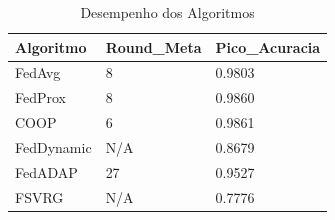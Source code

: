\begin{table}
\caption{Desempenho dos Algoritmos}
\label{tab:performance}
\begin{tabular}{lll}
\toprule
Algoritmo & Round_Meta & Pico_Acuracia \\
\midrule
FedAvg & 8 & 0.9803 \\
FedProx & 8 & 0.9860 \\
COOP & 6 & 0.9861 \\
FedDynamic & N/A & 0.8679 \\
FedADAP & 27 & 0.9527 \\
FSVRG & N/A & 0.7776 \\
\bottomrule
\end{tabular}
\end{table}
